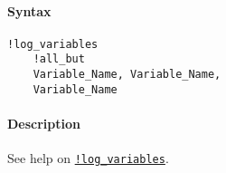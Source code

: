 


	\paragraph{Syntax}\label{syntax}

\begin{verbatim}
!log_variables
    !all_but
    Variable_Name, Variable_Name, 
    Variable_Name
\end{verbatim}

\paragraph{Description}\label{description}

See help on \href{modellang/logvariables}{\texttt{!log\_variables}}.


